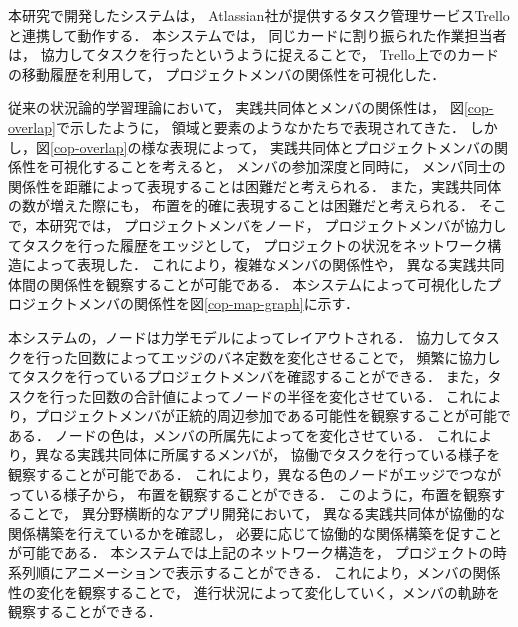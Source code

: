 

本研究で開発したシステムは，
Atlassian社が提供するタスク管理サービスTrelloと連携して動作する．
本システムでは，
同じカードに割り振られた作業担当者は，
協力してタスクを行ったというように捉えることで，
Trello上でのカードの移動履歴を利用して，
プロジェクトメンバの関係性を可視化した．

従来の状況論的学習理論において，
実践共同体とメンバの関係性は，
図\ref{cop-overlap}で示したように，
領域と要素のようなかたちで表現されてきた．
しかし，図\ref{cop-overlap}の様な表現によって，
実践共同体とプロジェクトメンバの関係性を可視化することを考えると，
メンバの参加深度と同時に，
メンバ同士の関係性を距離によって表現することは困難だと考えられる．
また，実践共同体の数が増えた際にも，
布置を的確に表現することは困難だと考えられる．
そこで，本研究では，
プロジェクトメンバをノード，
プロジェクトメンバが協力してタスクを行った履歴をエッジとして，
プロジェクトの状況をネットワーク構造によって表現した．
これにより，複雑なメンバの関係性や，
異なる実践共同体間の関係性を観察することが可能である．
本システムによって可視化したプロジェクトメンバの関係性を図\ref{cop-map-graph}に示す．

本システムの，ノードは力学モデルによってレイアウトされる．
協力してタスクを行った回数によってエッジのバネ定数を変化させることで，
頻繁に協力してタスクを行っているプロジェクトメンバを確認することができる．
また，タスクを行った回数の合計値によってノードの半径を変化させている．
これにより，プロジェクトメンバが正統的周辺参加である可能性を観察することが可能である．
ノードの色は，メンバの所属先によってを変化させている．
これにより，異なる実践共同体に所属するメンバが，
協働でタスクを行っている様子を観察することが可能である．
これにより，異なる色のノードがエッジでつながっている様子から，
布置を観察することができる．
このように，布置を観察することで，
異分野横断的なアプリ開発において，
異なる実践共同体が協働的な関係構築を行えているかを確認し，
必要に応じて協働的な関係構築を促すことが可能である．
本システムでは上記のネットワーク構造を，
プロジェクトの時系列順にアニメーションで表示することができる．
これにより，メンバの関係性の変化を観察することで，
進行状況によって変化していく，メンバの軌跡を観察することができる．

